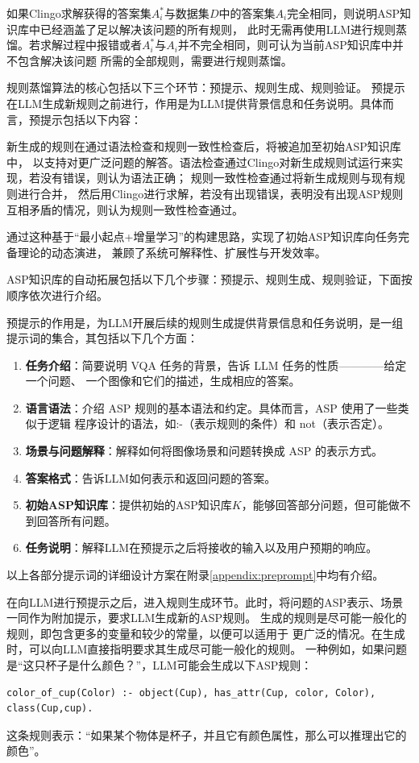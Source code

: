 如果Clingo求解获得的答案集$A^*_i$与数据集$D$中的答案集$A_i$完全相同，则说明ASP知识库中已经涵盖了足以解决该问题的所有规则，
此时无需再使用LLM进行规则蒸馏。若求解过程中报错或者$A^*_i$与$A_i$并不完全相同，则可认为当前ASP知识库中并不包含解决该问题
所需的全部规则，需要进行规则蒸馏。

规则蒸馏算法的核心包括以下三个环节：预提示、规则生成、规则验证。
预提示在LLM生成新规则之前进行，作用是为LLM提供背景信息和任务说明。具体而言，预提示包括以下内容：

新生成的规则在通过语法检查和规则一致性检查后，将被追加至初始ASP知识库中，
以支持对更广泛问题的解答。语法检查通过Clingo对新生成规则试运行来实现，若没有错误，则认为语法正确；
规则一致性检查通过将新生成规则与现有规则进行合并，
然后用Clingo进行求解，若没有出现错误，表明没有出现ASP规则互相矛盾的情况，则认为规则一致性检查通过。

通过这种基于“最小起点+增量学习”的构建思路，实现了初始ASP知识库向任务完备理论的动态演进，
兼顾了系统可解释性、扩展性与开发效率。

ASP知识库的自动拓展包括以下几个步骤：预提示、规则生成、规则验证，下面按顺序依次进行介绍。

预提示的作用是，为LLM开展后续的规则生成提供背景信息和任务说明，是一组提示词的集合，其包括以下几个方面：
\begin{enumerate}[nosep]
\item \textbf{任务介绍}：简要说明 VQA 任务的背景，告诉 LLM 任务的性质————给定一个问题、
一个图像和它们的描述，生成相应的答案。
\item \textbf{语言语法}：介绍 ASP 规则的基本语法和约定。具体而言，ASP 使用了一些类似于逻辑
程序设计的语法，如:-（表示规则的条件）和 not（表示否定）。
\item \textbf{场景与问题解释}：解释如何将图像场景和问题转换成 ASP 的表示方式。
\item \textbf{答案格式}：告诉LLM如何表示和返回问题的答案。
\item \textbf{初始ASP知识库}：提供初始的ASP知识库$K$，能够回答部分问题，但可能做不到回答所有问题。
\item \textbf{任务说明}：解释LLM在预提示之后将接收的输入以及用户预期的响应。
\end{enumerate}
以上各部分提示词的详细设计方案在附录\ref{appendix:preprompt}中均有介绍。

在向LLM进行预提示之后，进入规则生成环节。此时，将问题的ASP表示、场景一同作为附加提示，要求LLM生成新的ASP规则。
生成的规则是尽可能一般化的规则，即包含更多的变量和较少的常量，以便可以适用于
更广泛的情况。在生成时，可以向LLM直接指明要求其生成尽可能一般化的规则。
一种例如，如果问题是“这只杯子是什么颜色？”，LLM可能会生成以下ASP规则：
\begin{lstlisting}
color_of_cup(Color) :- object(Cup), has_attr(Cup, color, Color), class(Cup,cup).
\end{lstlisting}
这条规则表示：“如果某个物体是杯子，并且它有颜色属性，那么可以推理出它的颜色”。

